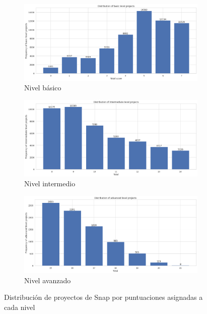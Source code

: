 \documentclass[a4paper, 12pt]{book}
\begin{document}
\begin{figure}
    \centering
    \begin{subfigure}[h]{.7\textwidth} 
        \includegraphics[width=\textwidth]{img/basic_Snap}
        \caption{Nivel básico}
        \label{fig:basic_Snap}
    \end{subfigure}       
    \begin{subfigure}[h]{.7\textwidth} 
        \includegraphics[width=\textwidth]{img/intermediate_Snap}
        \caption{Nivel intermedio}
        \label{fig:intermediate}
    \end{subfigure}
    \begin{subfigure}[h]{.7\textwidth} 
        \includegraphics[width=\textwidth]{img/advanced_Snap}
        \caption{Nivel avanzado}
        \label{fig:advanced}
    \end{subfigure}
    \caption{Distribución de proyectos de Snap por puntuaciones asignadas a cada nivel}
\end{figure}
\end{document}

